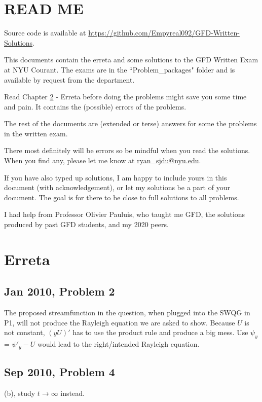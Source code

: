\documentclass[11pt,letterpaper]{book}
\theoremstyle{definition}
\begin{document}
\renewcommand\thesection{\arabic{section}.}
\renewcommand\thesubsection{(\arabic{section}.\alph{subsection})}

\setcounter{tocdepth}{1}
\tableofcontents

\chapter{READ ME}
Source code is available at \url{https://github.com/Empyreal092/GFD-Written-Solutions}.

This documents contain the erreta and some solutions to the GFD Written Exam at NYU Courant. The exams are in the ``Problem\_packages" folder and is available by request from the department.

Read Chapter \ref{chap:erreta} - Erreta before doing the problems might save you some time and pain. It contains the (possible) errors of the problems. 

The rest of the documents are (extended or terse) answers for some the problems in the written exam.

There most definitely will be errors so be mindful when you read the solutions. When you find any, please let me know at \url{ryan_sjdu@nyu.edu}. 

If you have also typed up solutions, I am happy to include yours in this document (with acknowledgement), or let my solutions be a part of your document. The goal is for there to be close to full solutions to all problems. 

I had help from Professor Olivier Pauluis, who taught me GFD, the solutions produced by past GFD students, and my 2020 peers.


\chapter{Erreta}\label{chap:erreta}
\section{Jan 2010, Problem 2}
The proposed streamfunction in the question, when plugged into the SWQG in P1, will not produce the Rayleigh equation we are asked to show. Because $U$ is not constant, $(yU)'$ has to use the product rule and produce a big mess. Use $\psi_y$ = $\psi'_y-U$ would lead to the right/intended Rayleigh equation.

\section{Sep 2010, Problem 4}
(b), study $t\to \infty$ instead.
\end{document}
